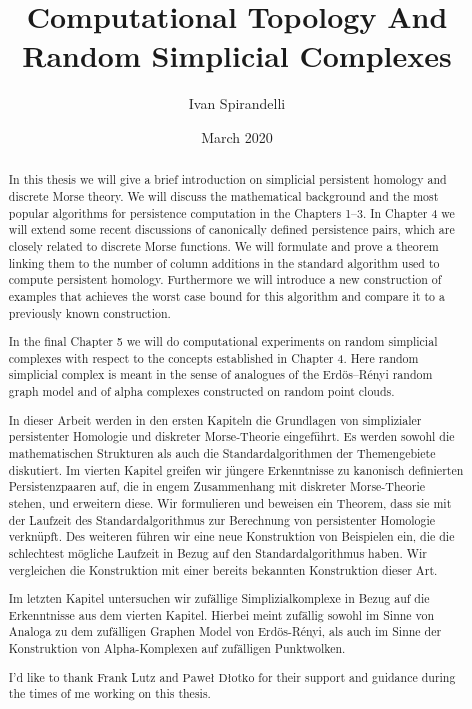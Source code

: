\documentclass[a4paper, 11pt]{report}
\title{Computational Topology And Random Simplicial Complexes}
\author{Ivan Spirandelli}
\date{March 2020}
\theoremstyle{plain}
\theoremstyle{definition}
\begin{document}

\newpage
\thispagestyle{empty}
\qquad
{}
\begin{abstract}
In this thesis we will give a brief introduction on simplicial persistent homology and discrete Morse theory. We will discuss the mathematical background and the most popular algorithms
for persistence computation in the Chapters 1--3. In Chapter 4 we will extend some recent discussions of canonically defined persistence pairs, which are closely related to discrete Morse functions. We will formulate and prove a theorem linking them to the number of column additions in the standard algorithm used to compute persistent homology. Furthermore we will introduce a new construction of examples that achieves the worst case bound for this algorithm and compare it to a previously known construction. 

In the final Chapter 5 we will do computational experiments on random simplicial complexes with respect to the concepts established in Chapter 4. Here random simplicial complex is meant in the sense of analogues of the Erdös--Rényi random graph model and of alpha complexes constructed on random point clouds. 
\end{abstract}
\begin{abstract}
In dieser Arbeit werden in den ersten Kapiteln die Grundlagen von simplizialer persistenter Homologie und diskreter Morse-Theorie eingeführt. Es werden sowohl die mathematischen Strukturen als auch die Standardalgorithmen der Themengebiete diskutiert. Im vierten Kapitel greifen wir jüngere Erkenntnisse zu kanonisch definierten Persistenzpaaren auf, die in engem Zusammenhang mit diskreter Morse-Theorie stehen, und erweitern diese. Wir formulieren und beweisen ein Theorem, dass sie mit der Laufzeit des Standardalgorithmus zur Berechnung von persistenter Homologie verknüpft. Des weiteren führen wir eine neue Konstruktion von Beispielen ein, die die schlechtest mögliche Laufzeit in Bezug auf den Standardalgorithmus haben. Wir vergleichen die Konstruktion mit einer bereits bekannten Konstruktion dieser Art. 

Im letzten Kapitel untersuchen wir zufällige Simplizialkomplexe in Bezug auf die Erkenntnisse aus dem vierten Kapitel. Hierbei meint zufällig sowohl im Sinne von Analoga zu dem zufälligen Graphen Model von Erdös-Rényi, als auch im Sinne der Konstruktion von Alpha-Komplexen auf zufälligen Punktwolken. 
\end{abstract}
\newpage
\renewcommand{\abstractname}{Acknowledgements}
\begin{abstract}
 I'd like to thank Frank Lutz and $\text{Pawe\l}$ $\text{D\l otko}$ for their support and guidance during the times of me working on this thesis. 
\end{abstract}
\thispagestyle{empty}
\end{document}
